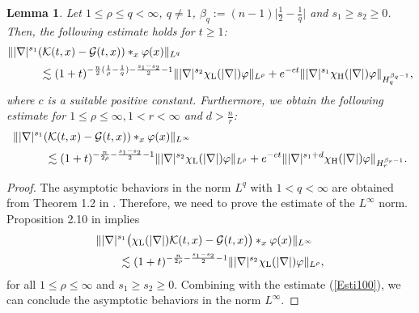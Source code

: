 \documentclass[11pt,reqno]{amsart}
\newtheorem{lemma}{Lemma}[section]
\begin{document}
\begin{lemma}\label{Lemma3.1}
    Let $1 \leq \rho \leq q < \infty$, $q \ne 1$, $\beta_q := (n-1)\big|\frac{1}{2}-\frac{1}{q}\big|$ and $s_1 \geq s_2 \geq 0$. Then, the following estimate holds for $t \geq 1$: 
    \begin{align*}
        &\||\nabla|^{s_1}(\mathcal{K}(t,x)- \mathcal{G}(t,x)) \ast_x \varphi(x)\|_{L^q}\\ &\hspace{1cm}\lesssim (1+t)^{-\frac{n}{2}(\frac{1}{\rho}-\frac{1}{q})-\frac{s_1-s_2}{2}-1} \||\nabla|^{s_2} \chi_{\rm L}(|\nabla|)\varphi\|_{L^{\rho}} + e^{-ct} \||\nabla|^{s_1} \chi_{\rm H}(|\nabla|) \varphi\|_{H^{\beta_q-1}_q},
    \end{align*}
    where $c$ is a suitable positive constant. Furthermore, we obtain the following estimate for $ 1\leq \rho \leq \infty, 1 < r < \infty$ and $d > \displaystyle\frac{n}{r}$:
    \begin{align*}
        &\||\nabla|^{s_1}(\mathcal{K}(t,x)- \mathcal{G}(t,x)) \ast_x \varphi(x)\|_{L^\infty}\\ &\hspace{1cm}\lesssim (1+t)^{-\frac{n}{2\rho}-\frac{s_1-s_2}{2}-1} \||\nabla|^{s_2} \chi_{\rm L}(|\nabla|)\varphi\|_{L^{\rho}} + e^{-ct} \||\nabla|^{s_1+d} \chi_{\rm H}(|\nabla|) \varphi\|_{H^{\beta_r-1}_r}.
    \end{align*}
\end{lemma}
\begin{proof}
  The asymptotic behaviors in the norm $L^q$ with $1 < q< \infty$
 are obtained from Theorem 1.2 in \cite{Ikeda2019}. Therefore, we need to prove the estimate of the $L^\infty$ norm.  Proposition 2.10 in \cite{Ikeda2019} implies
    \begin{align*}
        &\||\nabla|^{s_1}\big(\chi_{\rm L}(|\nabla|)\mathcal{K}(t,x)- \mathcal{G}(t,x)\big) \ast_x \varphi(x)\|_{L^\infty} \\
        &\quad\quad\lesssim (1+t)^{-\frac{n}{2\rho}-\frac{s_1-s_2}{2}-1} \||\nabla|^{s_2} \chi_{\rm L}(|\nabla|)\varphi\|_{L^{\rho}}, 
    \end{align*}
    for all $1 \leq \rho \leq \infty$ and $s_1 \geq s_2 \geq 0$. Combining with the estimate (\ref{Esti100}), we can conclude the asymptotic behaviors in the norm $L^\infty$.
\end{proof}
\end{document}
